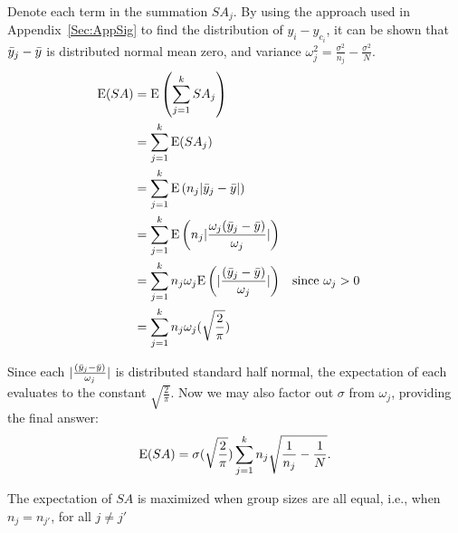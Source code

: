 Denote each term in the summation $SA_j$. By using the approach used in Appendix~\ref{Sec:AppSig} to find the distribution of $y_i - y_{c_i}$, it can be shown that $\bar{y}_j - \bar y$ is distributed normal mean zero, and variance $\omega_j^2 = \frac{\sigma^2}{n_j} - \frac{\sigma^2}{N}$.
\begin{align*}
    \text{E}(SA) &= \text{E}\left(\sum_{j=1}^k SA_j\right) \\
    &= \sum_{j=1}^k \text{E}(SA_j) \\
    &= \sum_{j=1}^k\text{E}\left(n_j|\bar{y}_j - \bar y|\right) \\
    &= \sum_{j=1}^k\text{E}\left(n_j|\frac{\omega_j(\bar{y}_j - \bar y)}{\omega_j}|\right) \\
    &= \sum_{j=1}^kn_j\omega_j\text{E}\left(|\frac{(\bar{y}_j - \bar y)}{\omega_j}|\right) &&\text{since } \omega_j > 0 \\
    &= \sum_{j=1}^kn_j\omega_j(\sqrt{\frac{2}{\pi}})
\end{align*}

Since each $|\frac{(\bar{y}_j - \bar y)}{\omega_j}|$ is distributed standard half normal, the expectation of each evaluates to the constant $\sqrt{\frac{2}{\pi}}$. Now we may also factor out $\sigma$ from $\omega_j$, providing the final answer:
\begin{equation*}
    \text{E}(SA) = \sigma(\sqrt{\frac{2}{\pi}})\sum_{j=1}^kn_j\sqrt{\frac{1}{n_j} - \frac{1}{N}}.
\end{equation*}

\begin{prop}
The expectation of $SA$ is maximized when group sizes are all equal, i.e., when $n_j = n_{j'}$, for all $j \neq j'$
\end{prop}

